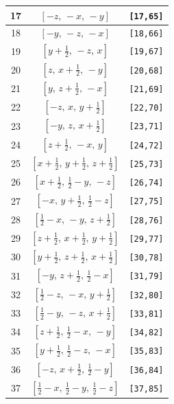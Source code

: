 \documentclass[fleqn,8pt]{jsarticle}
\begin{document}
\begin{longtable}{ccc}
17 & $\left[ - z,\, - x,\, - y \right]$ & {\tt [17,65]} \\ \hline
18 & $\left[ - y,\, - z,\, - x \right]$ & {\tt [18,66]} \\ \hline
19 & $\left[ y + \frac{1}{2},\, - z,\, x \right]$ & {\tt [19,67]} \\ \hline
20 & $\left[ z,\, x + \frac{1}{2},\, - y \right]$ & {\tt [20,68]} \\ \hline
21 & $\left[ y,\, z + \frac{1}{2},\, - x \right]$ & {\tt [21,69]} \\ \hline
22 & $\left[ - z,\, x,\, y + \frac{1}{2} \right]$ & {\tt [22,70]} \\ \hline
23 & $\left[ - y,\, z,\, x + \frac{1}{2} \right]$ & {\tt [23,71]} \\ \hline
24 & $\left[ z + \frac{1}{2},\, - x,\, y \right]$ & {\tt [24,72]} \\ \hline
25 & $\left[ x + \frac{1}{2},\, y + \frac{1}{2},\, z + \frac{1}{2} \right]$ & {\tt [25,73]} \\ \hline
26 & $\left[ x + \frac{1}{2},\, \frac{1}{2} - y,\, - z \right]$ & {\tt [26,74]} \\ \hline
27 & $\left[ - x,\, y + \frac{1}{2},\, \frac{1}{2} - z \right]$ & {\tt [27,75]} \\ \hline
28 & $\left[ \frac{1}{2} - x,\, - y,\, z + \frac{1}{2} \right]$ & {\tt [28,76]} \\ \hline
29 & $\left[ z + \frac{1}{2},\, x + \frac{1}{2},\, y + \frac{1}{2} \right]$ & {\tt [29,77]} \\ \hline
30 & $\left[ y + \frac{1}{2},\, z + \frac{1}{2},\, x + \frac{1}{2} \right]$ & {\tt [30,78]} \\ \hline
31 & $\left[ - y,\, z + \frac{1}{2},\, \frac{1}{2} - x \right]$ & {\tt [31,79]} \\ \hline
32 & $\left[ \frac{1}{2} - z,\, - x,\, y + \frac{1}{2} \right]$ & {\tt [32,80]} \\ \hline
33 & $\left[ \frac{1}{2} - y,\, - z,\, x + \frac{1}{2} \right]$ & {\tt [33,81]} \\ \hline
34 & $\left[ z + \frac{1}{2},\, \frac{1}{2} - x,\, - y \right]$ & {\tt [34,82]} \\ \hline
35 & $\left[ y + \frac{1}{2},\, \frac{1}{2} - z,\, - x \right]$ & {\tt [35,83]} \\ \hline
36 & $\left[ - z,\, x + \frac{1}{2},\, \frac{1}{2} - y \right]$ & {\tt [36,84]} \\ \hline
37 & $\left[ \frac{1}{2} - x,\, \frac{1}{2} - y,\, \frac{1}{2} - z \right]$ & {\tt [37,85]} \\ \hline

\end{longtable}
\end{document}
